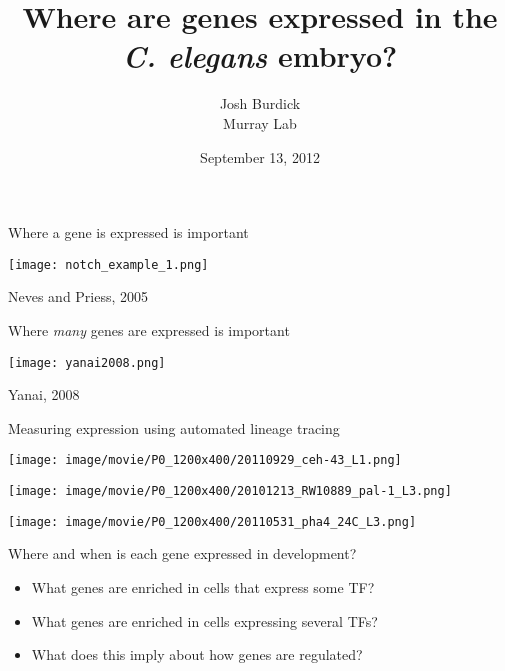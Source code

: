 \documentclass[serif,9pt]{beamer}
\title{Where are genes expressed in the {\em C. elegans} embryo?}
\author{Josh Burdick \\ Murray Lab}
\date{September 13, 2012}
\begin{document}
\begin{frame}
\titlepage
\end{frame}

\begin{frame}{Where a gene is expressed is important}

\begin{centering}
\texttt{[image: notch\_example\_1.png]}
\end{centering}

\hfill Neves and Priess, 2005

\end{frame}

\begin{frame}{Where {\em many} genes are expressed is important}

\texttt{[image: yanai2008.png]}

\hfill Yanai, 2008

\end{frame}

\begin{frame}{Measuring expression using automated lineage tracing}

{\center
\texttt{[image: image/movie/P0\_1200x400/20110929\_ceh-43\_L1.png]}

\texttt{[image: image/movie/P0\_1200x400/20101213\_RW10889\_pal-1\_L3.png]}

\texttt{[image: image/movie/P0\_1200x400/20110531\_pha4\_24C\_L3.png]}

}

\end{frame}

\begin{frame}{Where and when is each gene expressed in development?}

\begin{itemize}

\item What genes are enriched in cells that express some TF?

\pause 

\item What genes are enriched in cells expressing several TFs?

\pause

\item What does this imply about how genes are regulated?

\end{itemize}

\end{frame}
\end{document}
